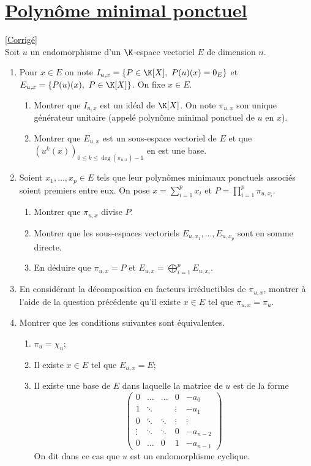 \documentclass[8pt]{book}
\begin{document}
	\section{\underline{Polynôme minimal ponctuel} }
	\label{Polynôme minimal ponctuel}
	\textcolor{blue}{\hyperref[Polynôme minimal ponctuel corrigé]{[Corrigé]}}\\
	Soit $u$ un endomorphisme d'un $\K$-espace vectoriel $E$ de dimension $n$.
	\begin{enumerate}[leftmargin=*]
		\item Pour $x\in E$ on note $I_{u,x}=\{P\in \K[X],\ P(u)(x)=0_E\}$ et $E_{u,x}=\{P(u)(x),\ P\in \K[X]\}$. On fixe $x\in E$.
		\begin{enumerate}[label=\alph*.]
			\item Montrer que $I_{u,x}$ est un idéal de $\K[X]$. On note $\pi_{u,x}$ son unique générateur unitaire (appelé polynôme minimal ponctuel de $u$ en $x$).
			\item Montrer que $E_{u,x}$ est un sous-espace vectoriel de $E$ et que $(u^k(x))_{0\leq k\leq \operatorname{deg}(\pi_{u,x})-1}$ en est une base.
		\end{enumerate}
		\item Soient $x_1,\dots,x_p\in E$ tels que leur polynômes minimaux ponctuels associés soient premiers entre eux. On pose $x=\displaystyle\sum\limits_{i=1}^p{x_i}$ et $P=\displaystyle\prod\limits_{i=1}^p{\pi_{u,x_i}}$.
		\begin{enumerate}[label=\alph*.]
			\item Montrer que $\pi_{u,x}$ divise $P$.
			\item Montrer que les sous-espaces vectoriels $E_{u,x_1},\dots,E_{u,x_p}$ sont en somme directe.
			\item En déduire que $\pi_{u,x}=P$ et $E_{u,x}=\displaystyle\bigoplus\limits_{i=1}^p{E_{u,x_i}}$.
		\end{enumerate}
		\item En considérant la décomposition en facteurs irréductibles de $\pi_{u,x}$, montrer à l'aide de la question précédente qu'il existe $x\in E$ tel que $\pi_{u,x}=\pi_u$.
		\item Montrer que les conditions suivantes sont équivalentes.
		\begin{enumerate}[label=(\roman*)]
			\item $\pi_u=\chi_u$;
			\item Il existe $x\in E$ tel que $E_{u,x}=E$;
			\item Il existe une base de $E$ dans laquelle la matrice de $u$ est de la forme
			$$\begin{pmatrix}
				0&\dots&\dots&0&-a_0\\
				1&\ddots&\ &\vdots&-a_1\\
				0&\ddots&\ddots&\vdots&\vdots\\
				\vdots&\ddots&\ddots&0&-a_{n-2}\\
				0&\dots&0&1&-a_{n-1}
			\end{pmatrix}$$
			On dit dans ce cas que $u$ est un endomorphisme cyclique.
		\end{enumerate}
	\end{enumerate}
	
\end{document}
